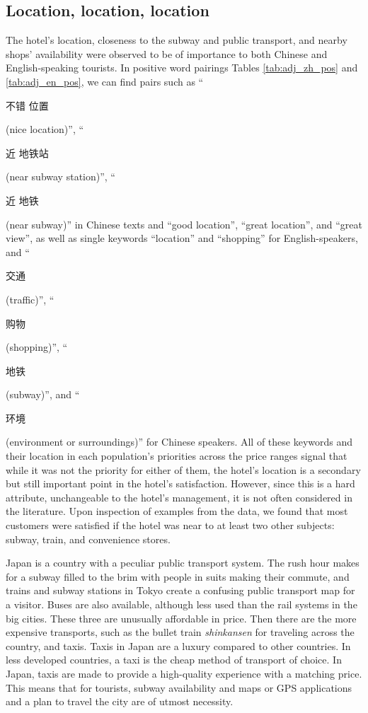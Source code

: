 \documentclass[smallextended,natbib]{svjour3}       %
\begin{document}
  \subsection{Location, location, location}\label{disc:location}

    The hotel's location, closeness to the subway and public transport, and nearby shops' availability were observed to be of importance to both Chinese and English-speaking tourists. In positive word pairings Tables \ref{tab:adj_zh_pos} and \ref{tab:adj_en_pos}, we can find pairs such as ``\begin{CJK}{UTF8}{gbsn}不错 位置\end{CJK} (nice location)'', ``\begin{CJK}{UTF8}{gbsn}近 地铁站\end{CJK} (near subway station)'', ``\begin{CJK}{UTF8}{gbsn}近 地铁\end{CJK} (near subway)'' in Chinese texts and ``good location'', ``great location'', and ``great view'', as well as single keywords ``location'' and ``shopping'' for English-speakers, and ``\begin{CJK}{UTF8}{gbsn}交通\end{CJK} (traffic)'', ``\begin{CJK}{UTF8}{gbsn}购物\end{CJK} (shopping)'', ``\begin{CJK}{UTF8}{gbsn}地铁\end{CJK} (subway)'', and ``\begin{CJK}{UTF8}{gbsn}环境\end{CJK} (environment or surroundings)'' for Chinese speakers. All of these keywords and their location in each population's priorities across the price ranges signal that while it was not the priority for either of them, the hotel's location is a secondary but still important point in the hotel's satisfaction. However, since this is a hard attribute, unchangeable to the hotel's management, it is not often considered in the literature. Upon inspection of examples from the data, we found that most customers were satisfied if the hotel was near to at least two other subjects: subway, train, and convenience stores. 

    Japan is a country with a peculiar public transport system. The rush hour makes for a subway filled to the brim with people in suits making their commute, and trains and subway stations in Tokyo create a confusing public transport map for a visitor. Buses are also available, although less used than the rail systems in the big cities. These three are unusually affordable in price. Then there are the more expensive transports, such as the bullet train \textit{shinkansen} for traveling across the country, and taxis. Taxis in Japan are a luxury compared to other countries. In less developed countries, a taxi is the cheap method of transport of choice. In Japan, taxis are made to provide a high-quality experience with a matching price. This means that for tourists, subway availability and maps or GPS applications and a plan to travel the city are of utmost necessity. 
\end{document}
